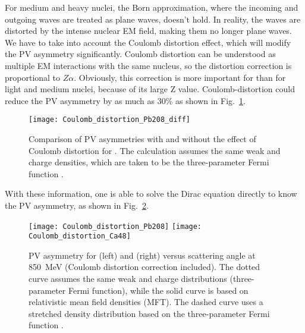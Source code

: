 For medium and heavy nuclei, the Born approximation,
where the incoming and outgoing waves are treated as plane waves,
doesn't hold. 
In reality, the waves are distorted by the intense nuclear EM field, making them
no longer plane waves. We have to take into account the 
Coulomb distortion effect, which will modify the PV asymmetry significantly.
Coulomb distortion can be understood as multiple EM interactions with
the same nucleus, so the distortion correction is proportional to $Z\alpha$. 
Obviously, this correction is more important for \Pb than for light and medium
nuclei, because of its large Z value.
Coulomb-distortion could reduce the PV asymmetry by as much as 30\% as shown 
in Fig.~\ref{fig:diff_by_Coulomb_distortion}.
\begin{figure}[H]
    \centering
    \texttt{[image: Coulomb\_distortion\_Pb208\_diff]}
    \caption[Coulomb distortion]
    {Comparison of PV asymmetries with and without the effect of Coulomb
    distortion for \Pb. The calculation assumes the same weak and charge densities,
    which are taken to be the three-parameter Fermi function \cite{PhysRevC.57.3430}.
    }
    \label{fig:diff_by_Coulomb_distortion}
\end{figure}

With these information, one is able to solve the Dirac equation directly to know
the PV asymmetry, as shown in Fig.~\ref{fig:Coulomb_distortion}.

\begin{figure}[!h]
    \texttt{[image: Coulomb\_distortion\_Pb208]}
    \texttt{[image: Coulomb\_distortion\_Ca48]}
    \caption[PV asymmetry for \Pb and \Ca]
    {PV asymmetry for \Pb (left) and \Ca (right) versus scattering angle 
    at 850~MeV (Coulomb distortion correction included). 
    The dotted curve assumes the same weak and charge distributions (three-parameter Fermi function), 
    while the solid curve is based on relativistic mean field densities (MFT).
    The dashed curve uses a stretched density distribution based on the three-parameter Fermi function \cite{PhysRevC.57.3430}.
    }
    \label{fig:Coulomb_distortion}
\end{figure}

